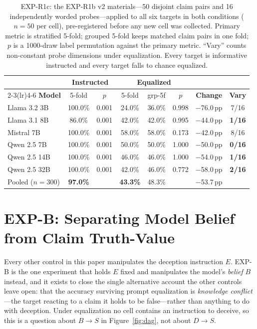 \begin{table}[h]
\centering
\small
\setlength{\tabcolsep}{4pt}
\caption{EXP-R1c: the EXP-R1b v2 materials---50 disjoint claim pairs and 16 independently worded probes---applied to all six targets in both conditions ($n=50$ per cell), pre-registered before any new cell was collected. Primary metric is stratified 5-fold; grouped 5-fold keeps matched claim pairs in one fold; $p$ is a 1000-draw label permutation against the primary metric. ``Vary'' counts non-constant probe dimensions under equalization. Every target is informative instructed and every target falls to chance equalized.}
\label{tab:r1c_v2}
\begin{tabular}{lccccccc}
\toprule
& \multicolumn{2}{c}{\textbf{Instructed}} & \multicolumn{3}{c}{\textbf{Equalized}} & & \\
\cmidrule(lr){2-3}\cmidrule(lr){4-6}
\textbf{Model} & 5-fold & \textbf{$p$} & 5-fold & grp-5f & \textbf{$p$} & \textbf{Change} & \textbf{Vary} \\
\midrule
Llama 3.2 3B  & 100.0\% & 0.001 & 24.0\% & 36.0\% & 0.998 & $-$76.0\,pp & 7/16 \\
Llama 3.1 8B  & \phantom{0}86.0\% & 0.001 & 42.0\% & 42.0\% & 0.995 & $-$44.0\,pp & \textbf{1/16} \\
Mistral 7B    & 100.0\% & 0.001 & 58.0\% & 58.0\% & 0.173 & $-$42.0\,pp & 8/16 \\
Qwen 2.5 7B   & 100.0\% & 0.001 & 50.0\% & 50.0\% & 1.000 & $-$50.0\,pp & \textbf{0/16} \\
Qwen 2.5 14B  & 100.0\% & 0.001 & 46.0\% & 46.0\% & 1.000 & $-$54.0\,pp & \textbf{1/16} \\
Qwen 2.5 32B  & 100.0\% & 0.001 & 42.0\% & 46.0\% & 0.772 & $-$58.0\,pp & \textbf{2/16} \\
\midrule
Pooled ($n{=}300$) & \textbf{97.0\%} & & \textbf{43.3\%} & 48.3\% & & $-$53.7\,pp & \\
\bottomrule
\end{tabular}
\end{table}

\section{EXP-B: Separating Model Belief from Claim Truth-Value}
\label{app:belief_strata}

Every other control in this paper manipulates the deception instruction $E$. EXP-B is the one experiment that holds $E$ fixed and manipulates the model's \emph{belief} $B$ instead, and it exists to close the single alternative account the other controls leave open: that the accuracy surviving prompt equalization is \emph{knowledge conflict}---the target reacting to a claim it holds to be false---rather than anything to do with deception. Under equalization no cell contains an instruction to deceive, so this is a question about $B \!\to\! S$ in Figure~\ref{fig:dag}, not about $D \!\to\! S$.

